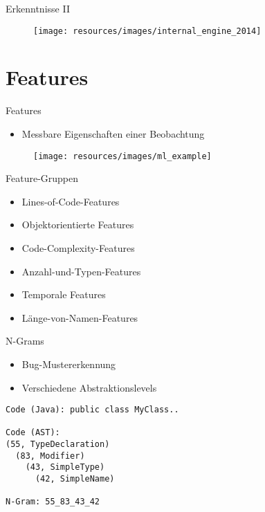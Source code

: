 \documentclass[12pt]{beamer}
\newenvironment{changemargin}[2]{%
	\begin{list}{}{%
			\setlength{\topsep}{0pt}%
			\setlength{\leftmargin}{#1}%
			\setlength{\rightmargin}{#2}%
			\setlength{\listparindent}{\parindent}%
			\setlength{\itemindent}{\parindent}%
			\setlength{\parsep}{\parskip}%
		}%
		\item[]}{\end{list}}
\begin{document}
\begin{frame}[fragile]{Erkenntnisse II}
	\begin{changemargin}{-1cm}{-1cm}
		\begin{figure}[h!]
			\centering
			\texttt{[image: resources/images/internal\_engine\_2014]}
		\end{figure}
	\end{changemargin}
\end{frame}

\section{Features} %


\begin{frame}[fragile]{Features}
	\begin{itemize}
		\item Messbare Eigenschaften einer Beobachtung
	\end{itemize}
	\begin{figure}[h!]
		\centering
		\texttt{[image: resources/images/ml\_example]}
		\label{fig:ml_example}
	\end{figure}
\end{frame}

\begin{frame}[fragile]{Feature-Gruppen}
	\begin{itemize}
		\item Lines-of-Code-Features
		\item Objektorientierte Features
		\item Code-Complexity-Features
		\item Anzahl-und-Typen-Features
		\item Temporale Features
		\item Länge-von-Namen-Features
	\end{itemize}
\end{frame}

\begin{frame}[fragile]{N-Grams}
	\begin{itemize}
		\item Bug-Mustererkennung
		\item Verschiedene Abstraktionslevels
	\end{itemize}
	\begin{lstlisting}[frame=single,label={lst:ngrams}]
Code (Java): public class MyClass..
	
Code (AST): 
(55, TypeDeclaration)
  (83, Modifier)
    (43, SimpleType)
      (42, SimpleName)
	
N-Gram: 55_83_43_42
	\end{lstlisting}
\end{frame}
\end{document}
